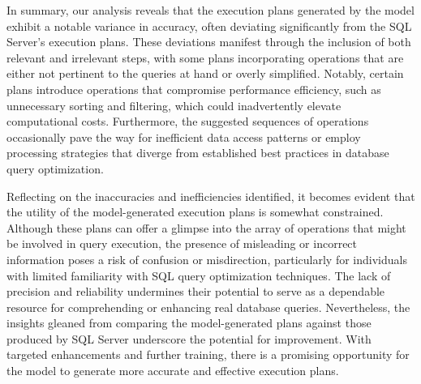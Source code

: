 In summary, our analysis reveals that the execution plans generated by the model exhibit a notable variance in accuracy, often deviating significantly from the SQL Server's execution plans. These deviations manifest through the inclusion of both relevant and irrelevant steps, with some plans incorporating operations that are either not pertinent to the queries at hand or overly simplified. Notably, certain plans introduce operations that compromise performance efficiency, such as unnecessary sorting and filtering, which could inadvertently elevate computational costs. Furthermore, the suggested sequences of operations occasionally pave the way for inefficient data access patterns or employ processing strategies that diverge from established best practices in database query optimization.

Reflecting on the inaccuracies and inefficiencies identified, it becomes evident that the utility of the model-generated execution plans is somewhat constrained. Although these plans can offer a glimpse into the array of operations that might be involved in query execution, the presence of misleading or incorrect information poses a risk of confusion or misdirection, particularly for individuals with limited familiarity with SQL query optimization techniques. The lack of precision and reliability undermines their potential to serve as a dependable resource for comprehending or enhancing real database queries. Nevertheless, the insights gleaned from comparing the model-generated plans against those produced by SQL Server underscore the potential for improvement. With targeted enhancements and further training, there is a promising opportunity for the model to generate more accurate and effective execution plans.

